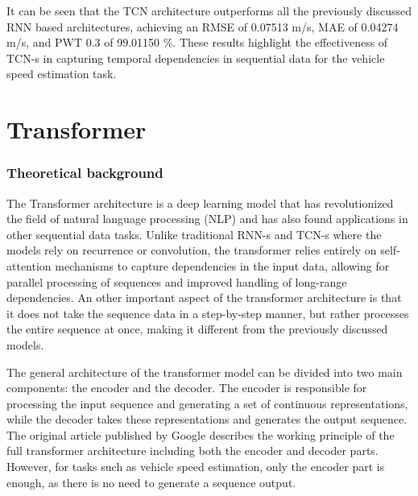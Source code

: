 It can be seen that the TCN architecture outperforms all the previously discussed RNN based architectures, achieving an RMSE of 0.07513 m/s, MAE of 0.04274 m/s, and PWT 0.3 of 99.01150 \%. These results highlight the effectiveness of TCN-s in capturing temporal dependencies in sequential data for the vehicle speed estimation task.

\section{Transformer}

\subsubsection{Theoretical background}

The Transformer architecture is a deep learning model that has revolutionized the field of natural language processing (NLP) and has also found applications in other sequential data tasks. Unlike traditional RNN-s and TCN-s where the models rely on recurrence or convolution, the transformer relies entirely on self-attention mechanisms to capture dependencies in the input data, allowing for parallel processing of sequences and improved handling of long-range dependencies. An other important aspect of the transformer architecture is that it does not take the sequence data in a step-by-step manner, but rather processes the entire sequence at once, making it different from the previously discussed models.

The general architecture of the transformer model can be divided into two main components: the encoder and the decoder. The encoder is responsible for processing the input sequence and generating a set of continuous representations, while the decoder takes these representations and generates the output sequence. The original article published by Google \cite{transformer_google} describes the working principle of the full transformer architecture including both the encoder and decoder parts. However, for tasks such as vehicle speed estimation, only the encoder part is enough, as there is no need to generate a sequence output.

